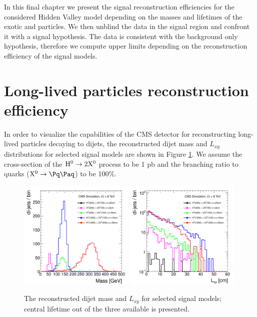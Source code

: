 In this final chapter we present the signal reconstruction efficiencies for the considered
 Hidden Valley
model depending on the masses and lifetimes of the exotic \Higgs and \X particles. 
We then unblind the data in the signal region and confront it with a
 signal hypothesis. The data is consistent with the background only hypothesis, therefore we
compute upper limits depending on the reconstruction efficiency of the signal models.

\section{Long-lived particles reconstruction efficiency}
\label{sec:signalefficiency}

In order to visualize the capabilities of the CMS detector for reconstructing long-lived particles decaying to 
dijets, 
the reconstructed dijet mass and $L_{xy}$ distributions for selected signal models are shown in Figure
\ref{fig:signal}. We assume the cross-section of the $\mathrm{H}^{0} \to 2\mathrm{X^{0}}$ process to be 1 pb and the branching 
ratio to quarks ($\X \to \qq$) to be 100\%.

\begin{figure}[htbp]
\centering
\includegraphics[width=0.49\textwidth]{plots/signal/mass.pdf}
\includegraphics[width=0.49\textwidth]{plots/signal/Lxy.pdf}
\caption{The reconstructed dijet mass and $L_{xy}$ for selected signal models; central lifetime out of the three available is presented.\label{fig:signal}}
\end{figure}

